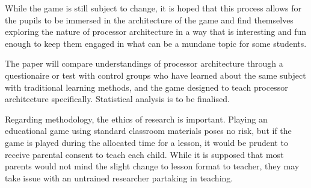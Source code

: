 \documentclass[a4paper]{article}
\begin{document}
While the game is still subject to change, it is hoped that this process allows for the pupils to be immersed in the architecture of the game and find themselves exploring the nature of processor architecture in a way that is interesting and fun enough to keep them engaged in what can be a mundane topic for some students. 

The paper will compare understandings of processor architecture through a questionaire or test with control groups who have learned about the same subject with traditional learning methods, and the game designed to teach processor architecture specifically. Statistical analysis is to be finalised. 

Regarding methodology, the ethics of research is important. Playing an educational game using standard classroom materials poses no risk, but if the game is played during the allocated time for a lesson, it would be prudent to receive parental consent to teach each child. While it is supposed that most parents would not mind the slight change to lesson format to teacher, they may take issue with an untrained researcher partaking in teaching. 
\end{document}
